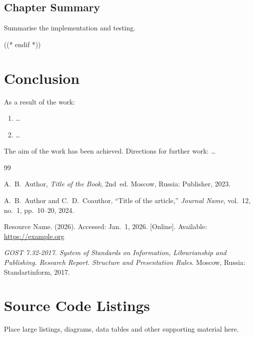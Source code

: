 \documentclass[12pt,a4paper]{extreport}
\begin{document}
\section{Chapter Summary}
Summarise the implementation and testing.

\clearpage
((* endif *))

\chapter*{Conclusion}
As a result of the work:
\begin{enumerate}[label=\arabic*), leftmargin=1.25cm]
  \item \ldots\ %
  \item \ldots\ %
\end{enumerate}

The aim of the work has been achieved. Directions for further work: \ldots

\clearpage

{}
\renewcommand{\refname}{References}
\begin{thebibliography}{99}

    A.~B.~Author, \emph{Title of the Book}, 2nd~ed. Moscow, Russia: Publisher,
    2023.

    A.~B.~Author and C.~D.~Coauthor, \enquote{Title of the article,}
    \emph{Journal Name}, vol.~12, no.~1, pp.~10--20, 2024.

    Resource Name. (2026). Accessed: Jan.~1, 2026. [Online]. Available:
    \url{https://example.org}

    \emph{GOST 7.32-2017. System of Standards on Information, Librarianship and
    Publishing. Research Report. Structure and Presentation Rules}. Moscow,
    Russia: Standartinform, 2017.

\end{thebibliography}

\clearpage

\appendix
\renewcommand{\thechapter}{\Alph{chapter}}
\titleformat{\chapter}[hang]
  {\normalfont\large\bfseries\centering}{Appendix~\thechapter}{1ex}{}

\chapter{Source Code Listings}
\label{app:listing}
Place large listings, diagrams, data tables and other supporting material here.
\end{document}
